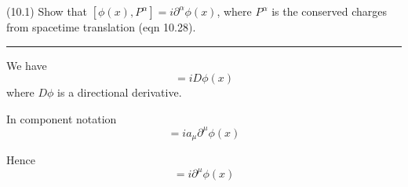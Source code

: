 \documentclass[12pt]{article}
\begin{document}
(10.1)
Show that $[\phi(x),P^\alpha]=i\partial^\alpha\phi(x)$, where $P^\alpha$ is
the conserved charges from spacetime translation
(eqn 10.28).

\bigskip
\hrule

\bigskip
We have
\begin{equation*}
[\phi(x),P]=iD\phi(x)
\end{equation*}
where $D\phi$ is a directional derivative.

\bigskip
In component notation
\begin{equation*}
[\phi(x),a_\mu P^\mu]=ia_\mu\partial^\mu\phi(x)
\end{equation*}

Hence
\begin{equation*}
[\phi(x),P^\mu]=i\partial^\mu\phi(x)
\end{equation*}
\end{document}
